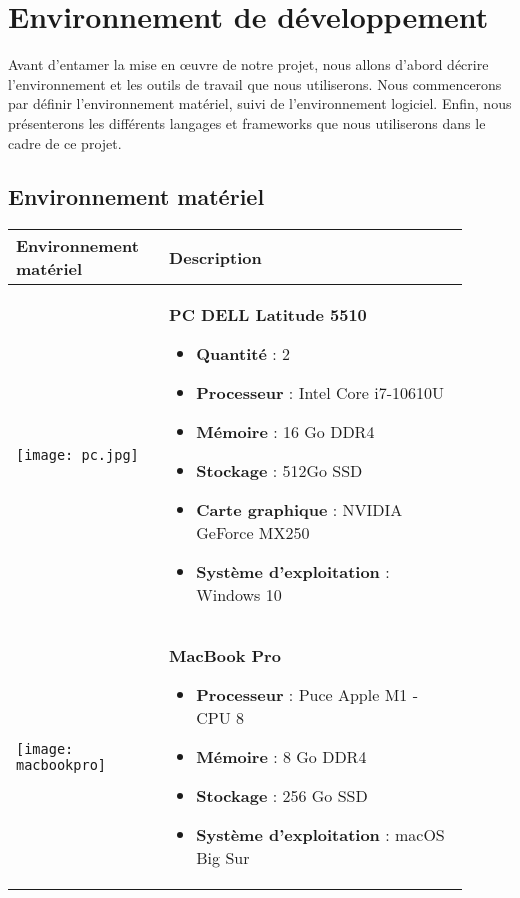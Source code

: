 \section{Environnement de développement}
Avant d'entamer la mise en œuvre de notre projet, nous allons d'abord décrire l'environnement et les outils de travail que nous utiliserons. Nous commencerons par définir l'environnement matériel, suivi de l'environnement logiciel. Enfin, nous présenterons les différents langages et frameworks que nous utiliserons dans le cadre de ce projet.

\subsection{Environnement matériel}

\begin{longtable}{|p{0.3\linewidth}|p{0.6\linewidth}|}
      \hline
      Environnement matériel & Description \\
      \hline
      
      \begin{minipage}{\linewidth}
       \texttt{[image: pc.jpg]}
      \end{minipage} &
      \begin{minipage}{\linewidth}
        \vspace{0.2cm}
        \textbf{PC DELL Latitude 5510}
        \begin{itemize}
          \item \textbf{Quantité} : 2
          \item \textbf{Processeur} : Intel Core i7-10610U 
          \item \textbf{Mémoire} : 16 Go DDR4 
          \item \textbf{Stockage} : 512Go SSD 
          \item \textbf{Carte graphique} : NVIDIA GeForce MX250 
          \item \textbf{Système d'exploitation} : Windows 10 
        \end{itemize}
        \vspace{0.2cm}
      \end{minipage} \\
      \hline
      \begin{minipage}{\linewidth}
       \texttt{[image: macbookpro]}
      \end{minipage} &
      \begin{minipage}{\linewidth}
        \vspace{0.2cm}
        \textbf{MacBook Pro}
        \begin{itemize}
          \item \textbf{Processeur} : Puce Apple M1 - CPU 8 
          \item \textbf{Mémoire} : 8 Go DDR4
          \item \textbf{Stockage} : 256 Go SSD
          \item \textbf{Système d'exploitation} : macOS Big Sur 
        \end{itemize}
        \vspace{0.2cm}
      \end{minipage} \\



\end{longtable}
